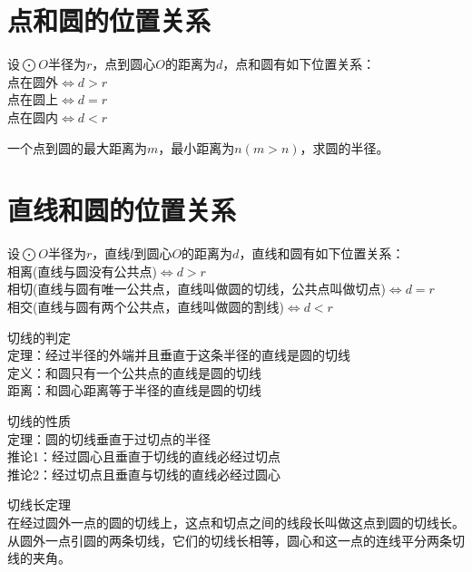 \section{点和圆的位置关系}
\begin{theorem}
    设$\bigodot O$半径为$r$，点到圆心$O$的距离为$d$，点和圆有如下位置关系：\\
    点在圆外$\Leftrightarrow d > r$ \\
    点在圆上$\Leftrightarrow d = r$ \\
    点在圆内$\Leftrightarrow d < r$
\end{theorem}
\begin{problem}
一个点到圆的最大距离为$m$，最小距离为$n(m>n)$，求圆的半径。
\end{problem}
\clearpage
\section{直线和圆的位置关系}
\begin{theorem}
    设$\bigodot O$半径为$r$，直线$l$到圆心$O$的距离为$d$，直线和圆有如下位置关系：\\
    相离(直线与圆没有公共点)$\Leftrightarrow d > r$ \\
    相切(直线与圆有唯一公共点，直线叫做圆的切线，公共点叫做切点)$\Leftrightarrow d = r$ \\
    相交(直线与圆有两个公共点，直线叫做圆的割线)$\Leftrightarrow d < r$
\end{theorem}
\begin{theorem}
    切线的判定 \\
    定理：经过半径的外端并且垂直于这条半径的直线是圆的切线 \\
    定义：和圆只有一个公共点的直线是圆的切线 \\
    距离：和圆心距离等于半径的直线是圆的切线
\end{theorem}
\begin{theorem}
    切线的性质 \\
    定理：圆的切线垂直于过切点的半径 \\
    推论1：经过圆心且垂直于切线的直线必经过切点 \\
    推论2：经过切点且垂直与切线的直线必经过圆心
\end{theorem}
\begin{theorem}
    切线长定理 \\
    在经过圆外一点的圆的切线上，这点和切点之间的线段长叫做这点到圆的切线长。\\
    从圆外一点引圆的两条切线，它们的切线长相等，圆心和这一点的连线平分两条切线的夹角。
\end{theorem}
\clearpage
